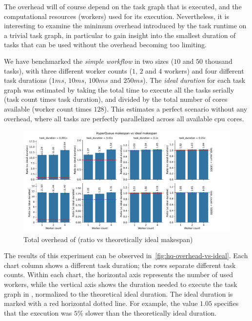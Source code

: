 The overhead will of course depend on the task graph that is executed, and the computational
resources (workers) used for its execution. Nevertheless, it is interesting to examine the minimum
overhead introduced by the task runtime on a trivial task graph, in particular to gain insight into
the smallest duration of tasks that can be used without the overhead becoming too limiting.

We have benchmarked the \emph{simple workflow} in two sizes ($10$ and
$50$ thousand tasks), with three different worker counts ($1$,
$2$ and $4$ workers) and four different task durations
($1ms$, $10ms$, $100ms$ and
$250ms$). The \emph{ideal duration} for each task graph was estimated by taking
the total time to execute all the tasks serially (task count times task duration), and divided by
the total number of cores available (worker count times $128$). This estimates a
perfect scenario without any overhead, where all tasks are perfectly parallelized across all
available \gls{cpu} cores.

\begin{figure}[h]
	\centering
	\includegraphics[width=\textwidth]{imgs/hq/charts/total-overhead-vs-ideal}
	\caption{Total overhead of \hyperqueue{} (ratio vs theoretically ideal makespan)}
	\label{fig:hq-overhead-vs-ideal}
\end{figure}

The results of this experiment can be observed in~\autoref{fig:hq-overhead-vs-ideal}. Each chart column shows
a different task duration; the rows separate different task counts. Within each chart, the
horizontal axis represents the number of used workers, while the vertical axis shows the duration
needed to execute the task graph in \hyperqueue{}, normalized to the theoretical ideal
duration. The ideal duration is marked with a red horizontal dotted line. For example, the value
$1.05$ specifies that the \hyperqueue{} execution was
$5\%$ slower than the theoretically ideal duration.

